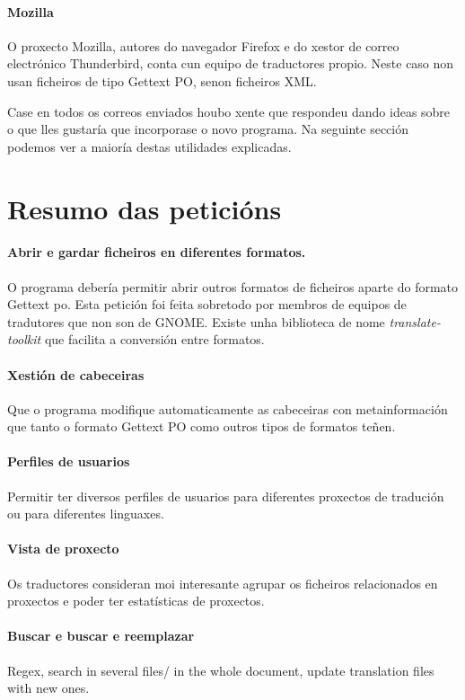\paragraph{Mozilla} O proxecto Mozilla, autores do navegador Firefox e do xestor de correo electrónico Thunderbird, conta cun equipo de traductores propio. Neste caso non usan ficheiros de tipo Gettext PO, senon ficheiros XML.

Case en todos os correos enviados houbo xente que respondeu dando ideas sobre o que lles gustaría que incorporase o novo programa. Na seguinte sección podemos ver a maioría destas utilidades explicadas.

\section{Resumo das peticións}
	\paragraph{Abrir e gardar ficheiros en diferentes formatos.} O programa debería permitir abrir outros formatos de ficheiros aparte do formato Gettext po. Esta petición foi feita sobretodo por membros de equipos de tradutores que non son de GNOME. Existe unha biblioteca de nome \emph{translate-toolkit} que facilita a conversión entre formatos.

	\paragraph{Xestión de cabeceiras} Que o programa modifique automaticamente as cabeceiras con metainformación que tanto o formato Gettext PO como outros tipos de formatos teñen.

	\paragraph{Perfiles de usuarios} Permitir ter diversos perfiles de usuarios para diferentes proxectos de tradución ou para diferentes linguaxes.

	\paragraph{Vista de proxecto} Os traductores consideran moi interesante agrupar os ficheiros relacionados en proxectos e poder ter estatísticas de proxectos.

	\paragraph{Buscar e buscar e reemplazar}  Regex, search in several files/ in the whole document, update translation files with new ones.

